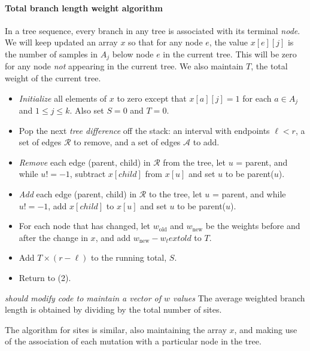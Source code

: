 \documentclass{article}
\newcommand{\plr}[1]{{\color{blue} \it #1}}
\begin{document}
\paragraph{Total branch length weight algorithm}
In a tree sequence, every branch in any tree is associated with its terminal \emph{node}.
We will keep updated an array $x$ so that for any node $e$,
the value $x[e][j]$ is the number of samples in $A_j$ below node $e$ in the current tree.
This will be zero for any node \emph{not} appearing in the current tree.
We also maintain $T$, the total weight of the current tree.
\begin{itemize}
    \item \emph{Initialize} all elements of $x$ to zero
        except that $x[a][j] = 1$ for each $a \in A_j$ and $1 \le j \le k$.
        Also set $S=0$ and $T=0$.
    \item Pop the next \emph{tree difference} off the stack: an interval with endpoints $\ell < r$,
        a set of edges $\mathcal{R}$ to remove, and a set of edges $\mathcal{A}$ to add.
    \item \emph{Remove} each edge (parent, child) in $\mathcal{R}$ from the tree,
        let $u$ = parent, and while $u != -1$,
        subtract $x[child]$ from $x[u]$ and set $u$ to be parent($u$).
    \item \emph{Add} each edge (parent, child) in $\mathcal{R}$ to the tree,
        let $u$ = parent, and while $u != -1$,
        add $x[child]$ to $x[u]$ and set $u$ to be parent($u$).
    \item For each node that has changed, let $w_\text{old}$ and $w_\text{new}$
        be the weights before and after the change in $x$,
        and add $w_\text{new} - w_text{old}$ to $T$.
    \item Add $T \times (r-\ell)$ to the running total, $S$.
    \item Return to (2).
\end{itemize}
\plr{should modify code to maintain a vector of $w$ values}
The average weighted branch length is obtained by dividing by the total number of sites.

The algorithm for sites is similar, also maintaining the array $x$,
and making use of the association of each mutation with a particular node in the tree.
\end{document}
